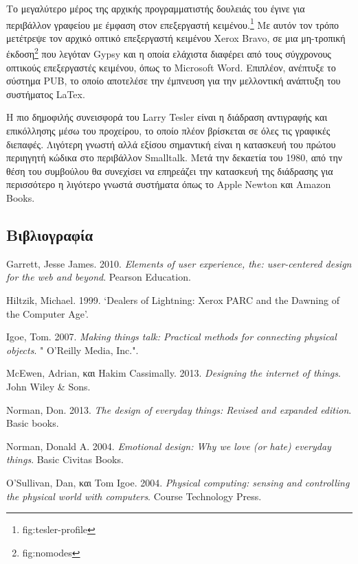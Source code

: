 \documentclass[
]{article}
\newlength{\cslhangindent}
\newlength{\cslentryspacingunit} %
\newenvironment{CSLReferences}[2] %
 {%
  \setlength{\parindent}{0pt}
  \ifodd #1
  \let\oldpar\par
  \def\par{\hangindent=\cslhangindent\oldpar}
  \fi
  \setlength{\parskip}{#2\cslentryspacingunit}
 }%
 {}
\begin{document}
Το μεγαλύτερο μέρος της αρχικής προγραμματιστής δουλειάς του έγινε για
περιβάλλον γραφείου με έμφαση στον επεξεργαστή κειμένου.\footnote{fig:tesler-profile}
Με αυτόν τον τρόπο μετέτρεψε τον αρχικό οπτικό επεξεργαστή κειμένου
Xerox Bravo, σε μια μη-τροπική έκδοση\footnote{fig:nomodes} που λεγόταν
Gypsy και η οποία ελάχιστα διαφέρει από τους σύγχρονους οπτικούς
επεξεργαστές κειμένου, όπως το Microsoft Word. Επιπλέον, ανέπτυξε το
σύστημα PUΒ, το οποίο αποτελέσε την έμπνευση για την μελλοντική ανάπτυξη
του συστήματος LaTex.

Η πιο δημοφιλής συνεισφορά του Larry Tesler είναι η διάδραση αντιγραφής
και επικόλλησης μέσω του προχείρου, το οποίο πλέον βρίσκεται σε όλες τις
γραφικές διεπαφές. Λιγότερη γνωστή αλλά εξίσου σημαντική είναι η
κατασκευή του πρώτου περιηγητή κώδικα στο περιβάλλον Smalltalk. Μετά την
δεκαετία του 1980, από την θέση του συμβούλου θα συνεχίσει να επηρεάζει
την κατασκευή της διάδρασης για περισσότερο η λιγότερο γνωστά συστήματα
όπως το Apple Newton και Amazon Books.

\hypertarget{ux3b2ux3b9ux3b2ux3bbux3b9ux3bfux3b3ux3c1ux3b1ux3c6ux3afux3b1}{%
\subsection*{Βιβλιογραφία}\label{ux3b2ux3b9ux3b2ux3bbux3b9ux3bfux3b3ux3c1ux3b1ux3c6ux3afux3b1}}

\hypertarget{refs}{}
\begin{CSLReferences}{0}{0}
\end{CSLReferences}

Garrett, Jesse James. 2010. \emph{Elements of user experience, the:
user-centered design for the web and beyond}. Pearson Education.

Hiltzik, Michael. 1999. {`Dealers of Lightning: Xerox PARC and the
Dawning of the Computer Age'}.

Igoe, Tom. 2007. \emph{Making things talk: Practical methods for
connecting physical objects}. " O'Reilly Media, Inc.".

McEwen, Adrian, και Hakim Cassimally. 2013. \emph{Designing the internet
of things}. John Wiley \& Sons.

Norman, Don. 2013. \emph{The design of everyday things: Revised and
expanded edition}. Basic books.

Norman, Donald A. 2004. \emph{Emotional design: Why we love (or hate)
everyday things}. Basic Civitas Books.

O'Sullivan, Dan, και Tom Igoe. 2004. \emph{Physical computing: sensing
and controlling the physical world with computers}. Course Technology
Press.
\end{document}
